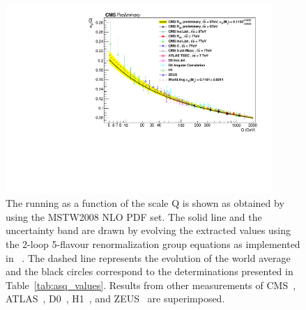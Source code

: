 %

\begin{figure}[tbp]
  \hftwo\includegraphics[width=0.9\textwidth]{Plots_HT_2_150/Running_alphas_8TeV_R32.pdf}\hftwo
  \caption{The running \alpsq as a function of the scale Q is shown as
    obtained by using the MSTW2008 NLO PDF set. The solid line and the
    uncertainty band are drawn by evolving the extracted \alpsmz
    values using the 2-loop 5-flavour renormalization group equations
    as implemented in \RunDec~\cite{Chetyrkin:2000yt,Schmidt:2012az}.
    The dashed line represents the evolution of the world
    average~\cite{Patrignani:2016xmw} and the black circles correspond
    to the \alpsq determinations presented in
    Table~\ref{tab:asq_values}. Results from other measurements of
    CMS~\cite{Chatrchyan:2013txa, Chatrchyan:2013haa,
      Khachatryan:2014waa, CMS:2014mna, Khachatryan:2016mlc},
    ATLAS~\cite{ATLAS:2015yaa}, D0~\cite{Abazov:2009nc,
      Abazov:2012lua}, H1~\cite{Andreev:2014wwa, Andreev:2016tgi}, and
    ZEUS~\cite{Abramowicz:2012jz} are superimposed.}
  \label{fig:running_alphas}
\end{figure}
